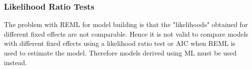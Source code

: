 \documentclass[12pt, a4paper]{report}
\begin{document}





\subsubsection{Likelihood Ratio Tests} The problem with REML for
model building is that the "likelihoods" obtained for different
fixed effects are not comparable. Hence it is not valid to compare
models with different fixed effects using a likelihood ratio test
or AIC when REML is used to estimate the model. Therefore models
derived using ML must be used instead.
\end{document}
